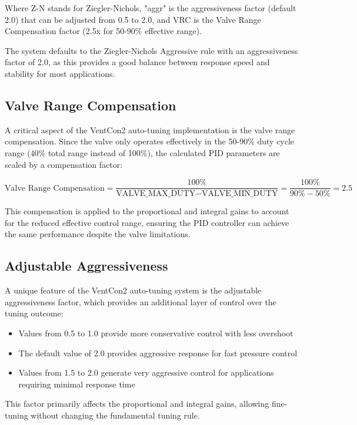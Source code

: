 \documentclass[a4paper,11pt]{article}
\begin{document}
Where Z-N stands for Ziegler-Nichols, "aggr" is the aggressiveness factor (default 2.0) that can be adjusted from 0.5 to 2.0, and VRC is the Valve Range Compensation factor (2.5x for 50-90\% effective range).

The system defaults to the Ziegler-Nichols Aggressive rule with an aggressiveness factor of 2.0, as this provides a good balance between response speed and stability for most applications.

\subsection{Valve Range Compensation}

A critical aspect of the VentCon2 auto-tuning implementation is the valve range compensation. Since the valve only operates effectively in the 50-90\% duty cycle range (40\% total range instead of 100\%), the calculated PID parameters are scaled by a compensation factor:

\begin{equation}
\text{Valve Range Compensation} = \frac{100\%}{\text{VALVE\_MAX\_DUTY} - \text{VALVE\_MIN\_DUTY}} = \frac{100\%}{90\% - 50\%} = 2.5
\end{equation}

This compensation is applied to the proportional and integral gains to account for the reduced effective control range, ensuring the PID controller can achieve the same performance despite the valve limitations.

\subsection{Adjustable Aggressiveness}

A unique feature of the VentCon2 auto-tuning system is the adjustable aggressiveness factor, which provides an additional layer of control over the tuning outcome:

\begin{itemize}
    \item Values from 0.5 to 1.0 provide more conservative control with less overshoot
    \item The default value of 2.0 provides aggressive response for fast pressure control
    \item Values from 1.5 to 2.0 generate very aggressive control for applications requiring minimal response time
\end{itemize}

This factor primarily affects the proportional and integral gains, allowing fine-tuning without changing the fundamental tuning rule.
\end{document}
